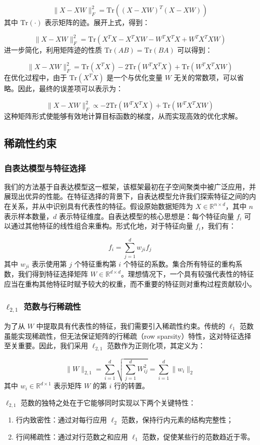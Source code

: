 \documentclass[12pt,a4paper,UTF8]{article}
\begin{document}
 $$
 \|X - XW\|_F^2 = \text{Tr}((X - XW)^T(X - XW))
 $$
 其中 $\text{Tr}(\cdot)$ 表示矩阵的迹。展开上式，得到：
 
 $$
 \|X - XW\|_F^2 = \text{Tr}(X^TX - X^TXW - W^TX^TX + W^TX^TXW)
 $$
 进一步简化，利用矩阵迹的性质 $\text{Tr}(AB) = \text{Tr}(BA)$ 可以得到：
 
 $$
 \|X - XW\|_F^2 = \text{Tr}(X^TX) - 2\text{Tr}(W^TX^TX) + \text{Tr}(W^TX^TXW)
 $$
 在优化过程中，由于 $\text{Tr}(X^TX)$ 是一个与优化变量 $W$ 无关的常数项，可以省略。因此，最终的误差项可以表示为：
 
 $$
 \|X - XW\|_F^2 \propto -2\text{Tr}(W^TX^TX) + \text{Tr}(W^TX^TXW)
 $$
 这种矩阵形式使能够有效地计算目标函数的梯度，从而实现高效的优化求解。
 
 \subsection{稀疏性约束}
 \subsubsection{自表达模型与特征选择}
 我们的方法基于自表达模型这一框架，该框架最初在子空间聚类中被广泛应用，并展现出优异的性能。在特征选择的背景下，自表达模型允许我们探索特征之间的内在关系，并从中识别具有代表性的特征。假设原始数据矩阵为 $X \in \mathbb{R}^{n \times d}$，其中 $n$ 表示样本数量，$d$ 表示特征维度。自表达模型的核心思想是：每个特征向量 $f_i$ 可以通过其他特征的线性组合来重构。形式化地，对于特征向量 $f_i$，我们有：
 
 $$
 f_i = \sum_{j=1}^{d} w_{ji}f_j
 $$
 其中 $w_{ji}$ 表示使用第 $j$ 个特征重构第 $i$ 个特征的系数。集合所有特征的重构系数，我们得到特征选择矩阵 $W \in \mathbb{R}^{d \times d}$。理想情况下，一个具有较强代表性的特征应当在重构其他特征时赋予较大的权重，而不重要的特征则对重构过程贡献较小。
 
 \subsubsection{$\ell_{2,1}$ 范数与行稀疏性}
 为了从 $W$ 中提取具有代表性的特征，我们需要引入稀疏性约束。传统的 $\ell_1$ 范数虽能实现稀疏性，但无法保证矩阵的行稀疏（row sparsity）特性，这对特征选择至关重要。因此，我们采用 $\ell_{2,1}$ 范数作为正则化项，其定义为：
 
 $$
 \|W\|_{2,1} = \sum_{i=1}^{d}\sqrt{\sum_{j=1}^{d}W_{ij}^2} = \sum_{i=1}^{d}\|w_i\|_2
 $$
 其中 $w_i \in \mathbb{R}^{d \times 1}$ 表示矩阵 $W$ 的第 $i$ 行的转置。
 
 $\ell_{2,1}$ 范数的独特之处在于它能够同时实现以下两个关键特性：
    \begin{enumerate}
 	\item 行内致密性：通过对每行应用 $\ell_2$ 范数，保持行内元素的结构完整性；
 	\item 行间稀疏性：通过对行范数之和应用 $\ell_1$ 范数，促使某些行的范数趋近于零。
 \end{enumerate}
 
\end{document}

